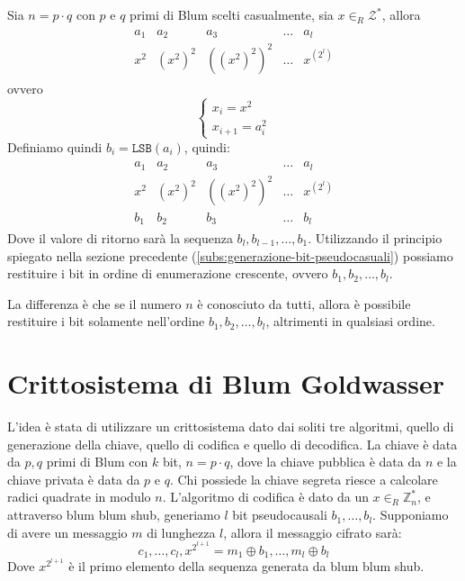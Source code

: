 Sia $n = p \cdot q$ con $p$ e $q$ primi di Blum scelti casualmente, sia 
$x \in_R \mathcal{Z}^*$, allora
\begin{align*}
  \begin{array}{lllll}
    a_1 & a_2 & a_3 & \dots & a_l \\
    x^2 & (x^2)^2 & ((x^2)^2)^2 & \dots & x^(2^l)
  \end{array}
\end{align*}
ovvero
\[
  \begin{cases}
    x_i = x^2\\
    x_{i+1} = a_i^2
  \end{cases}  
\]
Definiamo quindi $b_i = \texttt{LSB}(a_i)$, quindi:
\begin{align*}
  \begin{array}{lllll}
    a_1 & a_2 & a_3 & \dots & a_l \\
    x^2 & (x^2)^2 & ((x^2)^2)^2 & \dots & x^(2^l)\\
    b_1 & b_2 & b_3 & \dots & b_l
  \end{array}
\end{align*}
Dove il valore di ritorno sarà la sequenza $b_l, b_{l-1}, \dots, b_1$.
Utilizzando il principio spiegato nella sezione precedente (\ref{subs:generazione-bit-pseudocasuali}) 
possiamo restituire i bit in ordine di enumerazione crescente, ovvero $b_1, b_2, \dots, b_l$.

La differenza è che se il numero $n$ è conosciuto da tutti, allora è possibile restituire i bit solamente 
nell'ordine $b_1, b_2, \dots, b_l$, altrimenti in qualsiasi ordine.

\section{Crittosistema di Blum Goldwasser}
L'idea è stata di utilizzare un crittosistema dato dai soliti tre algoritmi, quello di generazione 
della chiave, quello di codifica e quello di decodifica.
La chiave è data da $p, q$ primi di Blum con $k$ bit, $n = p \cdot q$, dove la chiave pubblica 
è data da $n$ e la chiave privata è data da $p$ e $q$.
Chi possiede la chiave segreta riesce a calcolare radici quadrate in modulo $n$. L'algoritmo 
di codifica è dato da un $x\in_R \mathbb{Z}_n^*$, e attraverso blum blum shub, generiamo 
$l$ bit pseudocausali $b_1, \dots, b_l$. Supponiamo di avere un messaggio $m$ di lunghezza $l$,
allora il messaggio cifrato sarà:
\[
  c_1, \dots, c_l, x^{2^{l+1}} = m_1 \oplus b_1, \dots, m_l \oplus b_l
\]
Dove $x^{2^{l+1}}$ è il primo elemento della sequenza generata da blum blum shub.

